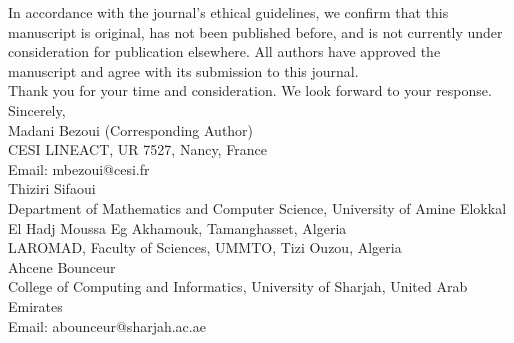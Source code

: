 \documentclass[11pt, a4paper]{article}
\begin{document}
In accordance with the journal's ethical guidelines, we confirm that this manuscript is original, has not been published before, and is not currently under consideration for publication elsewhere. All authors have approved the manuscript and agree with its submission to this journal.\\[0.5cm]
Thank you for your time and consideration. We look forward to your response.\\[0.6cm]
Sincerely,\\[0.12cm]
\singlespacing
\noindent Madani Bezoui (Corresponding Author)\\
CESI LINEACT, UR 7527, Nancy, France\\
Email: mbezoui@cesi.fr\\[0.12cm]
Thiziri Sifaoui\\
Department of Mathematics and Computer Science, University of Amine Elokkal El Hadj Moussa Eg Akhamouk, Tamanghasset, Algeria\\
LAROMAD, Faculty of Sciences, UMMTO, Tizi Ouzou, Algeria\\[0.12cm]
Ahcene Bounceur\\
College of Computing and Informatics, University of Sharjah, United Arab Emirates\\
Email: abounceur@sharjah.ac.ae
\end{document}
